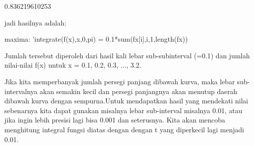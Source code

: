 \documentclass[a4paper,10pt]{article}
\begin{document}
\begin{eulernotebook}
\begin{eulercomment}
\begin{eulercomment}
\begin{eulercomment}
\begin{eulercomment}
\begin{eulercomment}
\begin{eulercomment}
\begin{eulercomment}
\begin{eulercomment}
\begin{eulercomment}
\begin{eulercomment}
\begin{eulercomment}
\begin{eulercomment}
\begin{eulercomment}
\begin{eulercomment}
\begin{eulercomment}
\begin{eulercomment}
\begin{eulercomment}
\begin{eulercomment}
\begin{eulercomment}
\begin{eulercomment}
\begin{eulercomment}
\begin{eulercomment}
\begin{eulercomment}
\begin{eulercomment}
\begin{eulercomment}
\begin{eulercomment}
\begin{eulercomment}
\begin{eulercomment}
\begin{eulercomment}
\begin{eulercomment}
\begin{eulercomment}
\begin{eulercomment}
\begin{eulercomment}
\begin{eulercomment}
\begin{eulercomment}
\begin{eulercomment}
\begin{eulercomment}
\begin{eulercomment}
\begin{eulercomment}
\begin{eulercomment}
\begin{eulercomment}
\begin{eulercomment}
\begin{eulercomment}
\begin{eulercomment}
\begin{eulercomment}
\begin{eulercomment}
\begin{eulercomment}
\begin{eulercomment}
\begin{eulercomment}
\begin{eulercomment}
\begin{eulercomment}
\begin{eulercomment}
\begin{eulercomment}
\begin{eulercomment}
\begin{euleroutput}
  0.836219610253
\end{euleroutput}
\begin{eulercomment}
jadi hasilnya adalah:

maxima: 'integrate(f(x),x,0,pi) = 0.1*sum(fx[i],i,1,length(fx))

Jumlah tersebut diperoleh dari hasil kali lebar sub-subinterval (=0.1)
dan jumlah nilai-nilai f(x) untuk x = 0.1, 0.2, 0.3, ..., 3.2.

Jika kita memperbanyak jumlah persegi panjang dibawah kurva, maka
lebar sub-intervalnya akan semakin kecil dan persegi panjangnya akan
menutup daerah dibawah kurva dengan sempurna.Untuk mendapatkan hasil
yang mendekati nilai sebenarnya kita dapat gunakan misalnya lebar
sub-interval misalnya 0.01, atau jika ingin lebih presisi lagi bisa
0.001 dan seterusnya. Kita akan mencoba menghitung integral fungsi
diatas dengan dengan t yang diperkecil lagi menjadi 0.01.
\end{eulercomment}
\begin{eulerprompt}

\end{eulerprompt}
\end{eulercomment}
\end{eulercomment}
\end{eulercomment}
\end{eulercomment}
\end{eulercomment}
\end{eulercomment}
\end{eulercomment}
\end{eulercomment}
\end{eulercomment}
\end{eulercomment}
\end{eulercomment}
\end{eulercomment}
\end{eulercomment}
\end{eulercomment}
\end{eulercomment}
\end{eulercomment}
\end{eulercomment}
\end{eulercomment}
\end{eulercomment}
\end{eulercomment}
\end{eulercomment}
\end{eulercomment}
\end{eulercomment}
\end{eulercomment}
\end{eulercomment}
\end{eulercomment}
\end{eulercomment}
\end{eulercomment}
\end{eulercomment}
\end{eulercomment}
\end{eulercomment}
\end{eulercomment}
\end{eulercomment}
\end{eulercomment}
\end{eulercomment}
\end{eulercomment}
\end{eulercomment}
\end{eulercomment}
\end{eulercomment}
\end{eulercomment}
\end{eulercomment}
\end{eulercomment}
\end{eulercomment}
\end{eulercomment}
\end{eulercomment}
\end{eulercomment}
\end{eulercomment}
\end{eulercomment}
\end{eulercomment}
\end{eulercomment}
\end{eulercomment}
\end{eulercomment}
\end{eulercomment}
\end{eulercomment}
\end{eulernotebook}
\end{document}
